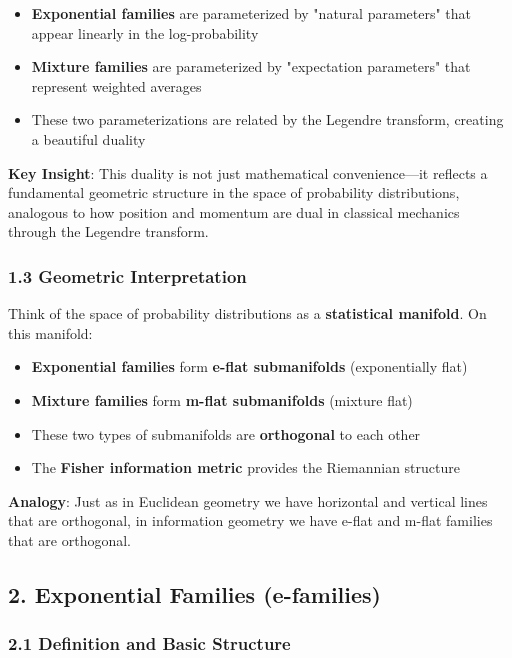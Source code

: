 \documentclass{amsart}
\theoremstyle{plain}
\theoremstyle{definition}
\theoremstyle{remark}
\begin{document}
\begin{itemize}
	\item \textbf{Exponential families} are parameterized by "natural parameters" that appear linearly in the log-probability
	\item \textbf{Mixture families} are parameterized by "expectation parameters" that represent weighted averages
	\item These two parameterizations are related by the Legendre transform, creating a beautiful duality
\end{itemize}

\textbf{Key Insight}: This duality is not just mathematical convenience—it reflects a fundamental geometric structure in the space of probability distributions, analogous to how position and momentum are dual in classical mechanics through the Legendre transform.

\subsubsection{1.3 Geometric Interpretation}

Think of the space of probability distributions as a \textbf{statistical manifold}. On this manifold:

\begin{itemize}
	\item \textbf{Exponential families} form \textbf{e-flat submanifolds} (exponentially flat)
	\item \textbf{Mixture families} form \textbf{m-flat submanifolds} (mixture flat)
	\item These two types of submanifolds are \textbf{orthogonal} to each other
	\item The \textbf{Fisher information metric} provides the Riemannian structure
\end{itemize}

\textbf{Analogy}: Just as in Euclidean geometry we have horizontal and vertical lines that are orthogonal, in information geometry we have e-flat and m-flat families that are orthogonal.

\subsection{2. Exponential Families (e-families)}

\subsubsection{2.1 Definition and Basic Structure}
\end{document}
